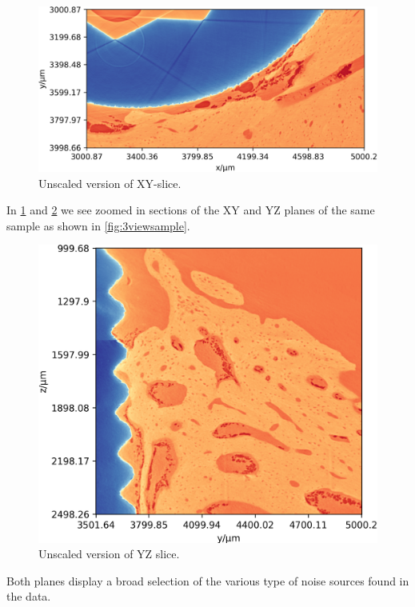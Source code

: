 \begin{figure}
\centering
\includegraphics[width=\textwidth]{figures/770c_pag-bic-xy-1x.png}
\caption{Unscaled version of XY-slice.}
\label{fig:xy-slice}
\end{figure}

In \cref{fig:xy-slice} and \cref{fig:yz-slice} we see zoomed in sections of the XY and YZ planes
of the same sample as shown in \cref{fig:3viewsample}.

\begin{figure}
\centering
\includegraphics[width=\columnwidth]{figures/770c_pag-bic-yz-1x.png}
\caption{Unscaled version of YZ slice.}
\label{fig:yz-slice}
\end{figure}

Both planes display a broad selection of the various type of noise sources found in the data.

